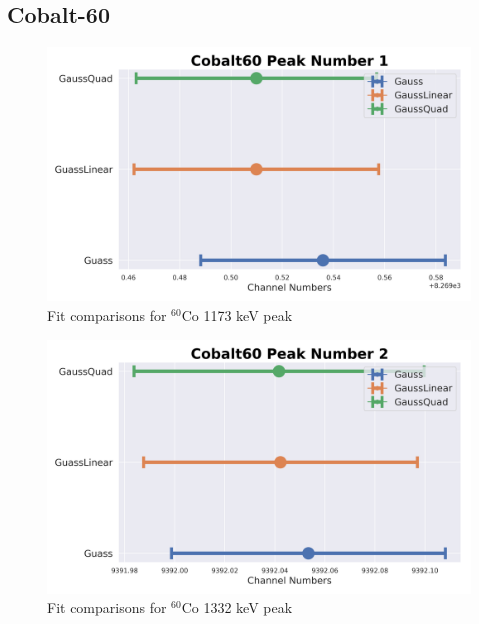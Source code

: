 \documentclass[11pt,a4paper]{article}
\newcommand{\element}[2]{$^{#2}\textrm{#1}$}
\begin{document}
\subsection{Cobalt-60}

\begin{figure}[H]
  \centering
  \includegraphics[width=0.95\linewidth]{./Images/Cobalt60/FitComparison_Peak1.png}
  \caption{Fit comparisons for \element{Co}{60} 1173 keV peak}
\end{figure}

\begin{figure}[H]
  \centering
  \includegraphics[width=0.95\linewidth]{./Images/Cobalt60/FitComparison_Peak2.png}
  \caption{Fit comparisons for \element{Co}{60} 1332 keV peak}
\end{figure}
\clearpage
\end{document}
